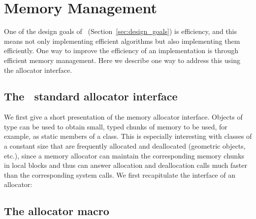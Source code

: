 
\chapter{Memory Management}
\label{chap:memory_management}

One of the design goals of \cgal\ (Section~\ref{sec:design_goals}) is 
efficiency,
and this means not only implementing efficient algorithms
but also implementing them efficiently.  One way to improve the efficiency
of an implementation is through efficient memory management.  Here we
describe one way to address this using the allocator interface.

\section{The \CC\ standard allocator interface}
\label{sec:allocator_interface}

We first give a short presentation of the memory allocator interface.
Objects of type  can be used to obtain small, typed 
chunks of memory to be used, for example, as static members of a class. 
This is especially
interesting with classes of a constant size that are frequently
allocated and deallocated (geometric objects, etc.), since a memory
allocator can maintain the corresponding memory chunks in local blocks
and thus can answer allocation and deallocation calls much faster than
the corresponding system calls. We first recapitulate the interface of
an allocator:



\section{The allocator macro}
\label{sec:allocator_macro}

